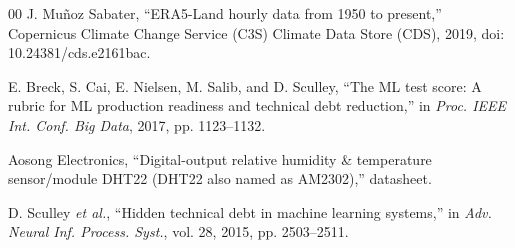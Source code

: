 \documentclass[conference]{IEEEtran}
\begin{document}
\begin{thebibliography}{00}
 J. Mu\~{n}oz Sabater, ``ERA5-Land hourly data from 1950 to present,'' Copernicus Climate Change Service (C3S) Climate Data Store (CDS), 2019, doi: 10.24381/cds.e2161bac.

 E. Breck, S. Cai, E. Nielsen, M. Salib, and D. Sculley, ``The ML test score: A rubric for ML production readiness and technical debt reduction,'' in \textit{Proc. IEEE Int. Conf. Big Data}, 2017, pp. 1123--1132.

 Aosong Electronics, ``Digital-output relative humidity \& temperature sensor/module DHT22 (DHT22 also named as AM2302),'' datasheet.

 D. Sculley \textit{et al.}, ``Hidden technical debt in machine learning systems,'' in \textit{Adv. Neural Inf. Process. Syst.}, vol. 28, 2015, pp. 2503--2511.

\end{thebibliography}
\end{document}
